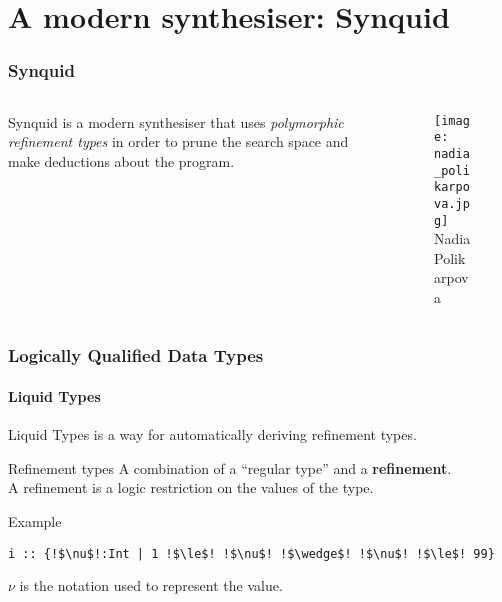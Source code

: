\documentclass{beamer}
\makeatletter
\newcommand{\hl}{\textcolor{fibeamer@darkColor1}}
\makeatother
\begin{document}
\section{A modern synthesiser: Synquid}

\begin{frame}
	\frametitle{\textbf{Synquid} \cite{polikarpova_program_2016}}

	\begin{columns}[c] %
		\begin{column}{.48\textwidth}
			Synquid is a modern synthesiser that uses \textit{polymorphic refinement types}
			in order to prune the search space and make deductions about the program.
		\end{column}%
		\begin{column}{.48\textwidth}%
			\begin{figure}
				\texttt{[image: nadia\_polikarpova.jpg]}\\
				Nadia Polikarpova
			\end{figure}


		\end{column}%
	\end{columns}

\end{frame}

%

\begin{frame}[fragile]
	\frametitle{Logically Qualified Data Types}
	\framesubtitle{Liquid Types \cite{rondon_liquid_2008}}

	Liquid Types is a way for automatically deriving \hl{refinement types}.

	\begin{block}{Refinement types}
		A combination of a ``regular type'' and a \textbf{refinement}.\\
		A refinement is a logic restriction on the values of the type.\\
	\end{block}

	\pause

	\begin{exampleblock}{Example}
		\vspace*{-.2\baselineskip}
		\begin{lstlisting}[escapechar=!,style=synquid]
i :: {!$\nu$!:Int | 1 !$\le$! !$\nu$! !$\wedge$! !$\nu$! !$\le$! 99}
		\end{lstlisting}
	\end{exampleblock}
	$\nu$ is the notation used to represent the value.
\end{frame}
\end{document}
